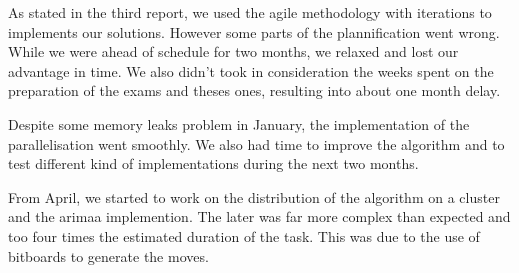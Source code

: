 As stated in the third report, we used the agile methodology with iterations to implements our solutions. However some parts of the plannification went wrong. While we were ahead of schedule for two months, we relaxed and lost our advantage in time. We also didn't took in consideration the weeks spent on the preparation of the exams and theses ones, resulting into about one month delay.

Despite some memory leaks problem in January, the implementation of the parallelisation went smoothly. We also had time to improve the algorithm and to test different kind of implementations during the next two months.

From April, we started to work on the distribution of the algorithm on a cluster and the arimaa implemention. The later was far more complex than expected and too four times the estimated duration of the task. This was due to the use of bitboards to generate the moves.